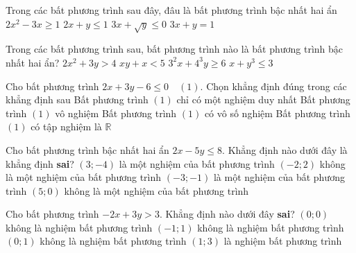 \begin{ex}%
	Trong các bất phương trình sau đây, đâu là bất phương trình bậc nhất hai ẩn
	\choice
	{$2x^2-3x \geq 1$}
	{\True $2x+y\leq 1$}
	{$3x+\sqrt{y} \leq 0$}
	{$3x+y=1$}
\end{ex}
\begin{ex}%
	Trong các bất phương trình sau, bất phương trình nào là bất phương trình bậc nhất hai ẩn?
	\choice
	{$2x^2+3y>4$}
	{$xy+x<5$}
	{\True $3^2x+4^3y \geq 6$}
	{$x+y^3 \leq 3$}
\end{ex}
\begin{ex}%
	Cho bất phương trình $2x+3y-6 \leq 0\quad (1)$. Chọn khẳng định đúng trong các khẳng định sau
	\choice
	{Bất phương trình $(1)$ chỉ có một nghiệm duy nhất}
	{Bất phương trình $(1)$ vô nghiệm}
	{\True Bất phương trình $(1)$ có vô số nghiệm}
	{Bất phương trình $(1)$ có tập nghiệm là $\mathbb{R}$}
\end{ex}
\begin{ex}%
 	Cho bất phương trình bậc nhất hai ẩn $2 x-5 y \leq 8$. Khẳng định nào dưới đây là khẳng định \textbf{sai}?
 	\choice
 	{$(3 ;-4)$ là một nghiệm của bất phương trình}
 	{\True $(-2 ; 2)$ không là một nghiệm của bất phương trình}
 	{ $(-3 ;-1)$ là một nghiệm của bất phương trình}
 	{ $(5 ; 0)$ không là một nghiệm của bất phương trình}
 \end{ex}
\begin{ex}%
 	Cho bất phương trình $-2 x+3 y>3$. Khẳng định nào dưới đây \textbf{sai}?
 	\choice 
 	{$(0 ; 0)$ không là nghiệm bất phương trình}
 	{\True $(-1 ; 1)$ không là nghiệm bất phương trình}
 	{$(0 ; 1)$ không là nghiệm bất phương trình}
 	{ $(1 ; 3)$ là nghiệm bất phương trình}
 \end{ex}
